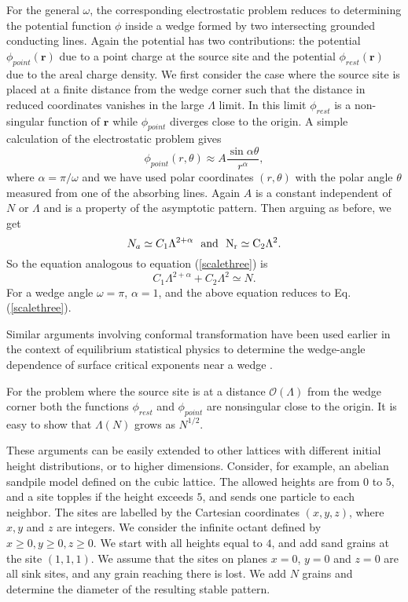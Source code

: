 \documentclass[11pt,a4paper]{book}
\begin{document}
For the general $\omega$, the corresponding electrostatic problem reduces to
determining the potential function $\phi$ inside a wedge formed by two
intersecting grounded conducting lines. Again the potential has two
contributions: the potential $\phi_{point}\left(\mathbf{r}  \right)$
due to a point charge at the source site and the potential $\phi_{rest}\left( \mathbf{r} \right)$
due to the areal charge density. We first consider the case where the source site is placed at a finite
distance from the wedge corner such that the distance in reduced
coordinates vanishes in the large $\Lambda$ limit. In this limit $\phi_{rest}$ is a non-singular
function of $\mathbf{r}$ while $\phi_{point}$ diverges close
to the origin. A simple  calculation of the electrostatic problem gives
\begin{equation}
\phi_{point}\left( r, \theta \right) \approx A \frac{\sin \alpha \theta}{r^{\alpha}},
\label{mpole}
\end{equation}
where $\alpha=\pi/\omega$ and we have used polar coordinates $\left( r, \theta \right)$ with
the polar angle $\theta$ measured from one of the absorbing lines.
Again $A$ is a constant independent of $N$ or $\Lambda$ and is a property of the asymptotic pattern.
Then arguing as before, we get
\begin{equation}
N_{a}\simeq C_{1}\Lambda^{2+\alpha}\rm{~ ~ and ~ ~ }N_{r}\simeq C_{2}\Lambda^{2}.
\label{na4}
\end{equation}
So the equation analogous to equation (\ref{scalethree}) is
\begin{equation}
C_{1}\Lambda^{2+\alpha}+C_{2}\Lambda^{2}\simeq N.
\label{scalefour}
\end{equation}
For a wedge angle $\omega=\pi$, $\alpha = 1$, and the above equation reduces to 
Eq.(\ref{scalethree}).

Similar arguments involving conformal transformation
have been used earlier in the context of equilibrium statistical physics to determine the wedge-angle dependence of surface critical
exponents near a wedge \cite{dup}.

For the problem where the source site is at a distance
$\mathcal{O}\left( \Lambda \right)$ from the wedge corner 
both the functions $\phi_{rest}$ and $\phi_{point}$ are nonsingular
close to the origin. It is easy to show that $\Lambda\left( N \right)$ grows as $N^{1/2}$.

These arguments can be easily extended to other lattices with
different initial height distributions, or to higher dimensions.
Consider, for example, an abelian sandpile model defined on the  cubic 
lattice. The allowed heights are from $0$ to $5$, and a site topples if the height
exceeds $5$, and sends one particle to each neighbor. The sites are labelled
by the Cartesian coordinates $(x,y,z)$, where $x,y$ and $z$ are integers. We
consider the infinite octant defined by $x\geq 0,y \geq 0,z \geq 0$. We start
with all heights equal to $4$, and add sand grains at the site $(1,1,1)$.  We assume
that the sites on planes $x=0$, $y=0$ and $z=0$ are all sink sites, and any grain reaching there is lost.
We add $N$ grains and determine the diameter of the resulting stable pattern. 
\end{document}
